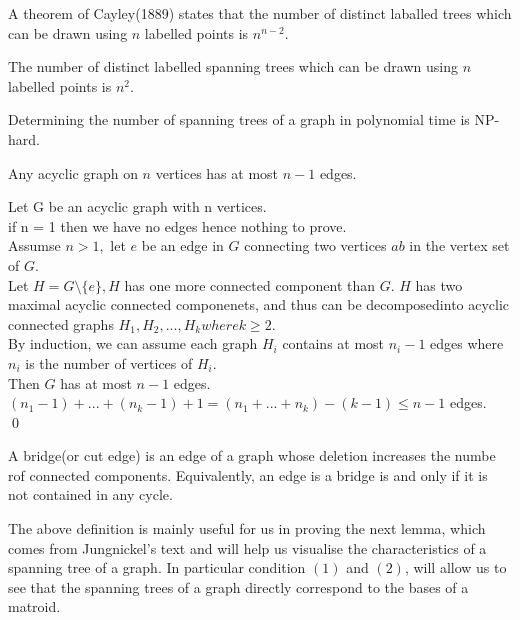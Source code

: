 \documentclass[../main.tex]{subfiles}
\begin{document}
\begin{prop}
 A theorem of Cayley(1889) states that the number of distinct laballed trees which can be drawn using $n$ labelled points is $ n^{n-2}$.
 \end{prop}

\begin{cor}
The number of distinct labelled spanning trees which can be drawn using $n$ labelled points is $n^2.$ 
\end{cor}

\begin{rem}
Determining the number of spanning trees of a graph in polynomial time is NP-hard.
\end{rem}

\begin{lem}\cite{jungnickel}
Any acyclic graph on $n$ vertices has at most $n-1$ edges.
\end{lem}
\noindent\Proof Let G be an acyclic graph with n vertices.\\
\noindent if n = 1 then we have no edges hence nothing to prove.\\
\noindent Assumse $n>1,$ let $e$ be an edge in $G$ connecting two vertices $ab$ in the vertex set of $G.$\\
\noindent Let $H = G \setminus \{e\}, H$ has one more connected component than $G.$ $H$ has two maximal acyclic connected componenets, and thus can be decomposedinto acyclic connected graphs $H_1, H_2, ..., H_k where k \geq 2.$\\
\noindent By induction, we can assume each graph $H_i$ contains at most $n_i - 1$ edges where $n_i$ is the number of vertices of $H_i.$\\
\noindent Then $G$ has at most $n-1$ edges.\\
\noindent $(n_1 - 1) + ... + (n_k - 1) + 1 = (n_1 + ... + n_k) - (k - 1) \leq n - 1$ edges.
\\ \qed

\begin{defn}[Bridge]
A bridge(or cut edge) is an edge of a graph whose deletion increases the numbe rof connected components. Equivalently, an edge is a bridge is and only if it is not contained in any cycle.
\end{defn}

\noindent The above definition is mainly useful for us in proving the next lemma, which comes from Jungnickel's text and will help us visualise the characteristics of a spanning tree of a graph. In particular condition $(1)$ and $(2)$, will allow us to see that the spanning trees of a graph directly correspond to the bases of a matroid.
\end{document}
